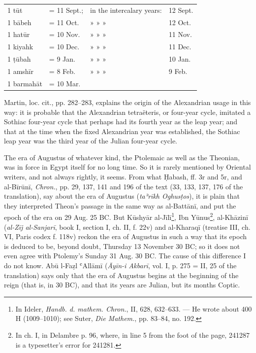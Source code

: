 \documentclass[11pt]{article}
\begin{document}
\begin{center}\small\begin{tabular}{llll}
1 tūt & = 11 Sept.; & in the intercalary years: & 12 Sept. \\
1 bābeh & = 11 Oct. & » » » & 12 Oct. \\
1 hatūr & = 10 Nov. & » » » & 11 Nov. \\
1 kiyahk & = 10 Dec. & » » » & 11 Dec. \\
1 ṭūbah & = 9 Jan. & » » » & 10 Jan. \\
1 amshīr & = 8 Feb. & » » » & 9 Feb. \\
1 barmahāt & = 10 Mar. &  &  \\
\end{tabular}\end{center}
\par Martin, loc. cit., pp. 282–283, explains the origin of the Alexandrian usage in this way: it is probable that the Alexandrian tetraëteris, or four-year cycle, imitated a Sothiac four-year cycle that perhaps had its fourth year as the leap year; and that at the time when the fixed Alexandrian year was established, the Sothiac leap year was the third year of the Julian four-year cycle.\par
\par The era of Augustus of whatever kind, the Ptolemaic as well as the Theonian, was in force in Egypt itself for no long time. So it is rarely mentioned by Oriental writers, and not always rightly, it seems. From what Ḥabash, ff. 3r and 5r, and al-Bīrūnī, \emph{Chron.}, pp. 29, 137, 141 and 196 of the text (33, 133, 137, 176 of the translation), say about the era of Augustus (\emph{taʾrīkh Oghusṭos}), it is plain that they interpreted Theon's passage in the same way as al-Battānī, and put the epoch of the era on 29 Aug. 25 BC. But Kūshyār al-Jīlī\footnote{In Ideler, \emph{Handb. d. mathem. Chron.}, II, 628, 632–633. — He wrote about 400 H (1009–1010); see Suter, \emph{Die Mathem.}, pp. 83–84, no. 192.}, Ibn Yūnus\footnote{In ch. I, in Delambre p. 96, where, in line 5 from the foot of the page, 241287 is a typesetter's error for 241281.}, al-Khāzinī (\emph{al-Zīj al-Sanjarī}, book I, section I, ch. II, f. 22v) and al-Kharaqī (treatise III, ch. VI, Paris codex f. 118v) reckon the era of Augustus in such a way that its epoch is deduced to be, beyond doubt, Thursday 13 November 30 BC; so it does not even agree with Ptolemy's Sunday 31 Aug. 30 BC. The cause of this difference I do not know. Abū l-Faẓl ʿAllāmī (\emph{Āyīn-i Akbarī}, vol. I, p. 275 = II, 25 of the translation) says only that the era of Augustus begins at the beginning of the reign (that is, in 30 BC), and that its years are Julian, but its months Coptic.\par
\end{document}
